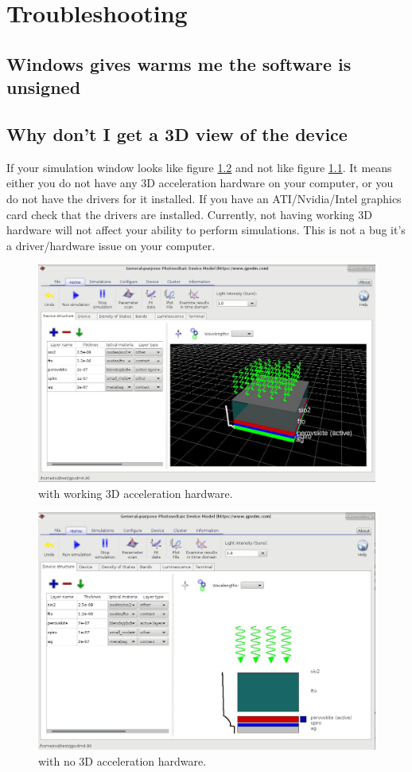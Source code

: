 \chapter{Troubleshooting}
\section{Windows gives warms me the software is unsigned}

\section{Why don't I get a 3D view of the device}

If your simulation window looks like figure \ref{fig:nothreed} and not like figure \ref{fig:threed}.  It means  either you do not have any 3D acceleration hardware on your computer, or you do not have the drivers for it installed.  If you have an ATI/Nvidia/Intel graphics card check that the drivers are installed.  Currently, not having working 3D hardware will not affect your ability to perform simulations. This is not a \simname bug it's a driver/hardware issue on your computer.

\begin{figure}[H]
\centering
\includegraphics[width=\textwidth]{./images/3d.jpg}
\caption{\simname with working 3D acceleration hardware.}
\label{fig:threed}
\end{figure}

\begin{figure}[H]
\centering
\includegraphics[width=\textwidth]{./images/no_3d.jpg}
\caption{\simname with no 3D acceleration hardware.}
\label{fig:nothreed}
\end{figure}


